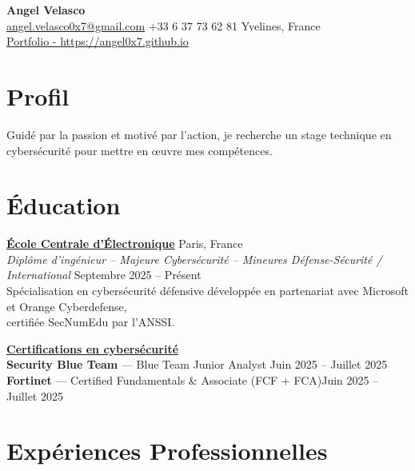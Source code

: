 \documentclass[a4paper,10pt]{article}
\newcommand{\linkedtitle}[2]{\href{#1}{\textbf{\color{myblue}#2}}}
\begin{document}
\begin{center}
    {\LARGE \textbf{Angel Velasco}}\\[3pt]
    \small
    \href{mailto:angel.velasco0x7@gmail.com}{angel.velasco0x7@gmail.com} \quad
    +33 6 37 73 62 81 \quad
    Yvelines, France \\
    {\Large \href{https://angel0x7.github.io}{Portfolio - https://angel0x7.github.io}} 
\end{center}



\section*{Profil}

\begin{center}
Guidé par la passion et motivé par l’action, je recherche un stage technique en cybersécurité pour mettre en œuvre mes compétences.
\end{center}

\section*{Éducation}

\noindent
\linkedtitle{https://www.ece.fr/en/program/engineering-cycle-bac4-information-systems-and-cybersecurity-major/}{École Centrale d'Électronique} \hfill Paris, France \\
\emph{Diplôme d'ingénieur – Majeure Cybersécurité – Mineures Défense-Sécurité / International} \hfill Septembre 2025 -- Présent \\
Spécialisation en cybersécurité défensive développée en partenariat avec Microsoft et Orange Cyberdefense,\\ certifiée SecNumEdu par l’ANSSI. 

\noindent
\linkedtitle{https://angel0x7.github.io}{Certifications en cybersécurité} \\
\textbf{Security Blue Team} — Blue Team Junior Analyst \hfill Juin 2025 -- Juillet 2025 \\
\textbf{Fortinet} — Certified Fundamentals \& Associate (FCF + FCA)\hfill Juin 2025 -- Juillet 2025 
\section*{Expériences Professionnelles}
\end{document}
